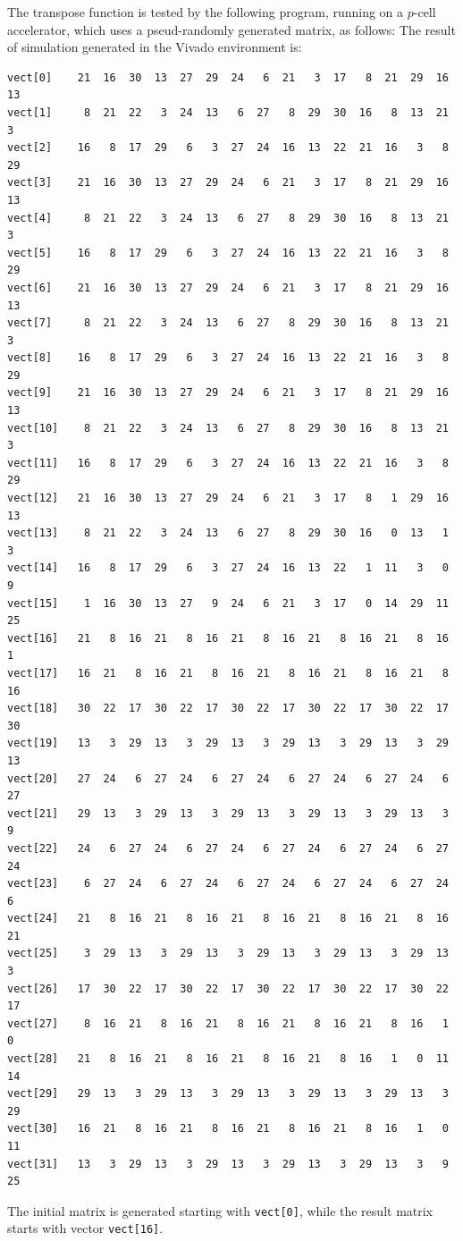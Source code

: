 \begin{exemplu}
The transpose function is tested by the following program, running on a $p$-cell accelerator, which uses a pseud-randomly generated matrix, as follows:
{\em 
{}
}
The result of simulation generated in the Vivado environment is:
\begin{verbatim}
vect[0]    21  16  30  13  27  29  24   6  21   3  17   8  21  29  16  13
vect[1]     8  21  22   3  24  13   6  27   8  29  30  16   8  13  21   3
vect[2]    16   8  17  29   6   3  27  24  16  13  22  21  16   3   8  29
vect[3]    21  16  30  13  27  29  24   6  21   3  17   8  21  29  16  13
vect[4]     8  21  22   3  24  13   6  27   8  29  30  16   8  13  21   3
vect[5]    16   8  17  29   6   3  27  24  16  13  22  21  16   3   8  29
vect[6]    21  16  30  13  27  29  24   6  21   3  17   8  21  29  16  13
vect[7]     8  21  22   3  24  13   6  27   8  29  30  16   8  13  21   3
vect[8]    16   8  17  29   6   3  27  24  16  13  22  21  16   3   8  29
vect[9]    21  16  30  13  27  29  24   6  21   3  17   8  21  29  16  13
vect[10]    8  21  22   3  24  13   6  27   8  29  30  16   8  13  21   3
vect[11]   16   8  17  29   6   3  27  24  16  13  22  21  16   3   8  29
vect[12]   21  16  30  13  27  29  24   6  21   3  17   8   1  29  16  13
vect[13]    8  21  22   3  24  13   6  27   8  29  30  16   0  13   1   3
vect[14]   16   8  17  29   6   3  27  24  16  13  22   1  11   3   0   9
vect[15]    1  16  30  13  27   9  24   6  21   3  17   0  14  29  11  25
vect[16]   21   8  16  21   8  16  21   8  16  21   8  16  21   8  16   1
vect[17]   16  21   8  16  21   8  16  21   8  16  21   8  16  21   8  16
vect[18]   30  22  17  30  22  17  30  22  17  30  22  17  30  22  17  30
vect[19]   13   3  29  13   3  29  13   3  29  13   3  29  13   3  29  13
vect[20]   27  24   6  27  24   6  27  24   6  27  24   6  27  24   6  27
vect[21]   29  13   3  29  13   3  29  13   3  29  13   3  29  13   3   9
vect[22]   24   6  27  24   6  27  24   6  27  24   6  27  24   6  27  24
vect[23]    6  27  24   6  27  24   6  27  24   6  27  24   6  27  24   6
vect[24]   21   8  16  21   8  16  21   8  16  21   8  16  21   8  16  21
vect[25]    3  29  13   3  29  13   3  29  13   3  29  13   3  29  13   3
vect[26]   17  30  22  17  30  22  17  30  22  17  30  22  17  30  22  17
vect[27]    8  16  21   8  16  21   8  16  21   8  16  21   8  16   1   0
vect[28]   21   8  16  21   8  16  21   8  16  21   8  16   1   0  11  14
vect[29]   29  13   3  29  13   3  29  13   3  29  13   3  29  13   3  29
vect[30]   16  21   8  16  21   8  16  21   8  16  21   8  16   1   0  11
vect[31]   13   3  29  13   3  29  13   3  29  13   3  29  13   3   9  25
\end{verbatim}
The initial matrix is generated starting with {\tt vect[0]}, while the result matrix starts with vector {\tt vect[16]}. 


\end{exemplu}
